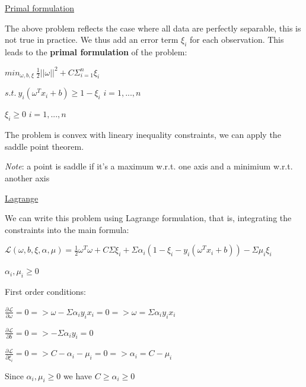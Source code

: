 \vspace{5mm}

\underline{Primal formulation}

\vspace{5mm}

The above problem reflects the case where all data are perfectly separable, this is not true in practice. We thus add an error term $\xi_i$ for each observation. This leads to the \textbf{primal formulation} of the problem:

\begin{center}
$min_{\omega,b, \xi}~\frac{1}{2}||\omega||^2+C\Sigma_{i=1}^{n}\xi_i$

$s.t.~y_i(\omega^Tx_i+b) \geq 1 - \xi_i$ $i=1,...,n$

$\xi_i \geq 0$ $i=1,...,n$
\end{center}

\vspace{5mm}

The problem is convex with lineary inequality constraints, we can apply the saddle point theorem.

\textit{Note}: a point is saddle if it's a maximum w.r.t. one axis and a minimium w.r.t. another axis 

\vspace{5mm}

\underline{Lagrange}

\vspace{5mm}

We can write this problem using Lagrange formulation, that is, integrating the constraints into the main formula:

$\mathcal{L}(\omega,b,\xi, \alpha, \mu) = \frac{1}{2}\omega^T\omega+C\Sigma \xi_i + \Sigma \alpha_i (1-\xi_i - y_i(\omega^Tx_i+b)) - \Sigma \mu_i \xi_i$

$\alpha_i, \mu_i \geq 0$

\vspace{5mm}

First order conditions:

$\frac{\partial\mathcal{L}}{\partial\omega} = 0 => \omega - \Sigma \alpha_i y_i x_i = 0 => \omega = \Sigma \alpha_i y_i x_i$

$\frac{\partial\mathcal{L}}{\partial b} = 0 => -\Sigma \alpha_i y_i = 0$

$\frac{\partial\mathcal{L}}{\partial \xi_i} = 0 => C - \alpha_i  - \mu_i = 0 => \alpha_i = C - \mu_i$

Since $\alpha_i, \mu_i \geq 0$ we have $C \geq \alpha_i \geq 0$

